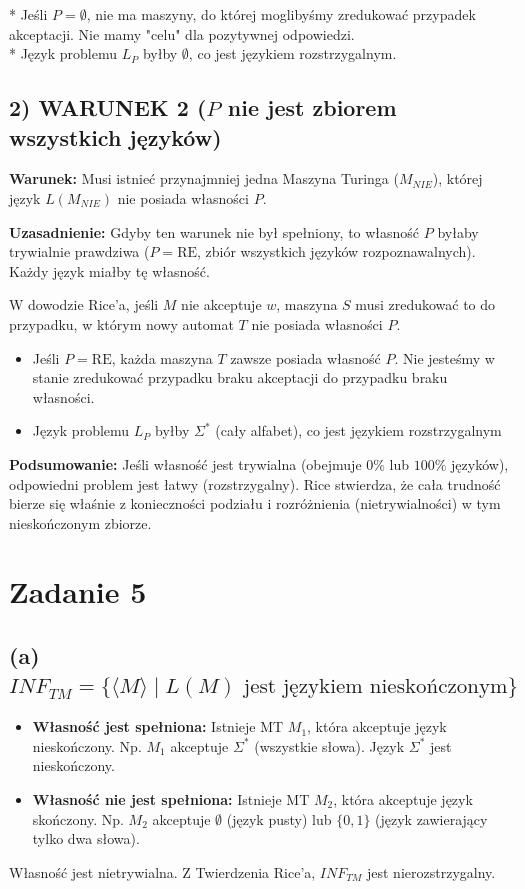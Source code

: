 \documentclass{article}
\begin{document}
* Jeśli $P = \emptyset$, nie ma maszyny, do której moglibyśmy zredukować przypadek akceptacji. Nie mamy "celu" dla pozytywnej odpowiedzi.\\
* Język problemu $L_P$ byłby $\emptyset$, co jest językiem rozstrzygalnym.

\subsection*{2) WARUNEK 2 ($P$ nie jest zbiorem wszystkich języków)}

\textbf{Warunek:} Musi istnieć przynajmniej jedna Maszyna Turinga ($M_{NIE}$), której język $L(M_{NIE})$ nie posiada własności $P$.

\textbf{Uzasadnienie:}
Gdyby ten warunek nie był spełniony, to własność $P$ byłaby trywialnie prawdziwa ($P = \mathrm{RE}$, zbiór wszystkich języków rozpoznawalnych). Każdy język miałby tę własność.

W dowodzie Rice'a, jeśli $M$ nie akceptuje $w$, maszyna $S$ musi zredukować to do przypadku, w którym nowy automat $T$ nie posiada własności $P$.
\begin{itemize}
    \item Jeśli $P = \mathrm{RE}$, każda maszyna $T$ zawsze posiada własność $P$. Nie jesteśmy w stanie zredukować przypadku braku akceptacji do przypadku braku własności.
    \item Język problemu $L_P$ byłby $\Sigma^*$ (cały alfabet), co jest językiem rozstrzygalnym
\end{itemize}


\textbf{Podsumowanie:} Jeśli własność jest trywialna (obejmuje $0\%$ lub $100\%$ języków), odpowiedni problem jest łatwy (rozstrzygalny). Rice stwierdza, że cała trudność bierze się właśnie z konieczności podziału i rozróżnienia (nietrywialności) w tym nieskończonym zbiorze.

\section{Zadanie 5}
\subsection*{(a) $INF_{TM} = \{\langle M \rangle \mid L(M) \text{ jest językiem nieskończonym}\}$}

\begin{itemize}
    \item \textbf{Własność jest spełniona:} Istnieje MT $M_1$, która akceptuje język nieskończony. Np. $M_1$ akceptuje $\Sigma^*$ (wszystkie słowa). Język $\Sigma^*$ jest nieskończony.
    \item \textbf{Własność nie jest spełniona:} Istnieje MT $M_2$, która akceptuje język skończony. Np. $M_2$ akceptuje $\emptyset$ (język pusty) lub $\{0, 1\}$ (język zawierający tylko dwa słowa).
\end{itemize}
Własność jest nietrywialna. Z Twierdzenia Rice’a, $INF_{TM}$ jest nierozstrzygalny.
\end{document}
